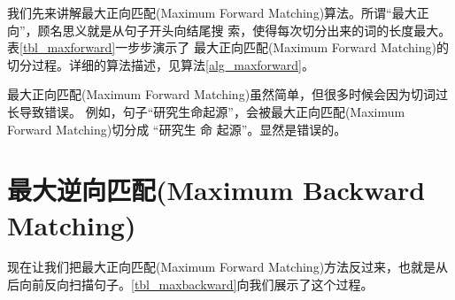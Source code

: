 \documentclass[11pt,a4paper]{article}
\def\maxforward{最大正向匹配(Maximum Forward Matching)}
\def\maxbackward{最大逆向匹配(Maximum Backward Matching)}
\begin{document}
我们先来讲解\maxforward 算法。所谓“最大正向”，顾名思义就是从句子开头向结尾搜
索，使得每次切分出来的词的长度最大。表\ref{tbl_maxforward}一步步演示了
\maxforward 的切分过程。详细的算法描述，见算法\ref{alg_maxforward}。

\begin{algorithm}
	\label{alg_maxforward}
	\dontprintsemicolon

	\caption{\maxforward}
\end{algorithm}

\maxforward 虽然简单，但很多时候会因为切词过长导致错误。
例如，句子“研究生命起源”，会被\maxforward 切分成 “研究生 命 起源”。显然是错误的。

\section{\maxbackward}

现在让我们把\maxforward 方法反过来，也就是从后向前反向扫描句子。\ref{tbl_maxbackward}向我们展示了这个过程。
\end{document}
